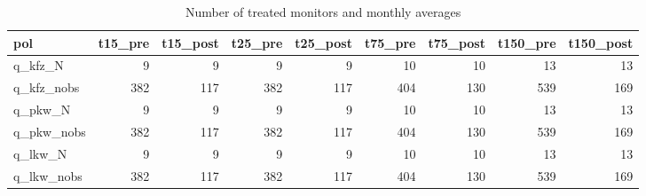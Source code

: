 \begin{table}[!htb]
\centering
\begingroup\footnotesize
\begin{tabular}{lrrrrrrrr}
  \toprule
pol & t15\_pre & t15\_post & t25\_pre & t25\_post & t75\_pre & t75\_post & t150\_pre & t150\_post \\ 
  \midrule
q\_kfz\_N & 9 & 9 & 9 & 9 & 10 & 10 & 13 & 13 \\ 
  q\_kfz\_nobs & 382 & 117 & 382 & 117 & 404 & 130 & 539 & 169 \\ 
  q\_pkw\_N & 9 & 9 & 9 & 9 & 10 & 10 & 13 & 13 \\ 
  q\_pkw\_nobs & 382 & 117 & 382 & 117 & 404 & 130 & 539 & 169 \\ 
  q\_lkw\_N & 9 & 9 & 9 & 9 & 10 & 10 & 13 & 13 \\ 
  q\_lkw\_nobs & 382 & 117 & 382 & 117 & 404 & 130 & 539 & 169 \\ 
   \bottomrule
\end{tabular}
\endgroup
\caption{Number of treated monitors and monthly averages} 
\end{table}
